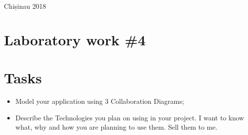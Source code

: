 \documentclass[12pt,a4paper,titlepage]{article}
\begin{document}
\begin{titlepage}
\begin{center}
      \vspace{5 mm}


      {\large Chișinau 2018}\\[3cm] %




      \vfill %
      \end{center}
      
\end{titlepage}

\cleardoublepage

\newpage

\setcounter{page}{1}
\setcounter{secnumdepth}{4}

\cleardoublepage


{}
\section*{Laboratory work \#4}

\section{Tasks}
\begin{itemize}
	\item
	Model your application using 3 Collaboration Diagrams;
	\item 
	Describe the Technologies you plan on using in your project. I want to know what,
why and how you are planning to use them. Sell them to me.
\end{itemize}
\end{document}
